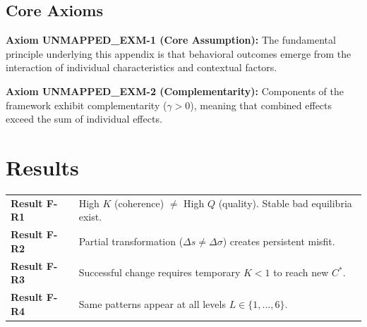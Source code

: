 % 
\subsection{Core Axioms}
\label{sec:exm-axioms}

\begin{tcolorbox}[colback=yellow!5!white,colframe=yellow!75!black,title=Axiom UNMAPPED_EXM-1: Fundamental Principle]
\textbf{Axiom UNMAPPED_EXM-1 (Core Assumption):}
The fundamental principle underlying this appendix is that behavioral outcomes
emerge from the interaction of individual characteristics and contextual factors.
\end{tcolorbox}

\begin{tcolorbox}[colback=yellow!5!white,colframe=yellow!75!black,title=Axiom UNMAPPED_EXM-2: Complementarity]
\textbf{Axiom UNMAPPED_EXM-2 (Complementarity):}
Components of the framework exhibit complementarity ($\gamma > 0$), meaning
that combined effects exceed the sum of individual effects.
\end{tcolorbox}


\section{Results}

\begin{tcolorbox}[colback=orange!5!white, colframe=orange!75!black,
    title=\textbf{Key Results: Universal Patterns}]

\begin{tabular}{@{}p{3cm}p{9cm}@{}}
\textbf{Result F-R1} & High $K$ (coherence) $\neq$ High $Q$ (quality). Stable bad equilibria exist. \\
\textbf{Result F-R2} & Partial transformation ($\Delta s \neq \Delta \sigma$) creates persistent misfit. \\
\textbf{Result F-R3} & Successful change requires temporary $K < 1$ to reach new $C^*$. \\
\textbf{Result F-R4} & Same patterns appear at all levels $L \in \{1,...,6\}$. \\
\end{tabular}

\end{tcolorbox}


